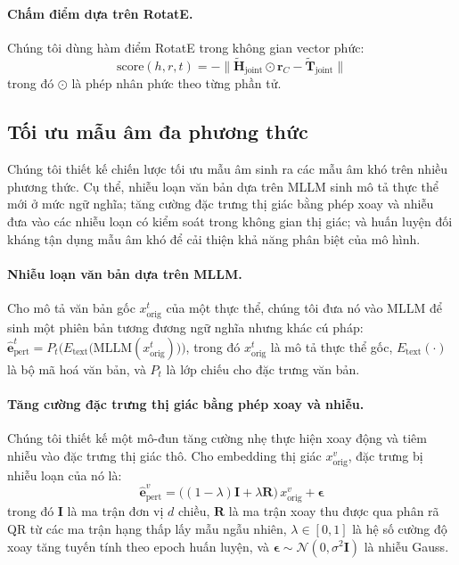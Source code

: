 \documentclass[10pt,twocolumn,a4paper]{article}
\newcommand{\score}{\mathrm{score}}
\begin{document}
\paragraph{Chấm điểm dựa trên RotatE.}
Chúng tôi dùng hàm điểm RotatE trong không gian vector phức:
\begin{equation}
\score(h, r, t) = -\big\|\tilde{\mathbf{H}}_{\mathrm{joint}} \odot \mathbf{r}_C - \tilde{\mathbf{T}}_{\mathrm{joint}}\big\|
\label{eq:10}
\end{equation}
trong đó $\odot$ là phép nhân phức theo từng phần tử.

\subsection{Tối ưu mẫu âm đa phương thức}

Chúng tôi thiết kế chiến lược tối ưu mẫu âm sinh ra các mẫu âm khó trên nhiều phương thức. Cụ thể, nhiễu loạn văn bản dựa trên MLLM sinh mô tả thực thể mới ở mức ngữ nghĩa; tăng cường đặc trưng thị giác bằng phép xoay và nhiễu đưa vào các nhiễu loạn có kiểm soát trong không gian thị giác; và huấn luyện đối kháng tận dụng mẫu âm khó để cải thiện khả năng phân biệt của mô hình.

\paragraph{Nhiễu loạn văn bản dựa trên MLLM.}
Cho mô tả văn bản gốc $x^t_{\mathrm{orig}}$ của một thực thể, chúng tôi đưa nó vào MLLM để sinh một phiên bản tương đương ngữ nghĩa nhưng khác cú pháp: $\hat{\mathbf{e}}^t_{\mathrm{pert}} = P_t\big(E_{\mathrm{text}}\big(\mathrm{MLLM}(x^t_{\mathrm{orig}})\big)\big)$, trong đó $x^t_{\mathrm{orig}}$ là mô tả thực thể gốc, $E_{\mathrm{text}}(\cdot)$ là bộ mã hoá văn bản, và $P_t$ là lớp chiếu cho đặc trưng văn bản.

\paragraph{Tăng cường đặc trưng thị giác bằng phép xoay và nhiễu.}
Chúng tôi thiết kế một mô-đun tăng cường nhẹ thực hiện xoay động và tiêm nhiễu vào đặc trưng thị giác thô. Cho embedding thị giác $x^v_{\mathrm{orig}}$, đặc trưng bị nhiễu loạn của nó là:
\begin{equation}
\hat{\mathbf{e}}^v_{\mathrm{pert}} = \big((1-\lambda)\mathbf{I} + \lambda\mathbf{R}\big)\, x^v_{\mathrm{orig}} + \boldsymbol{\epsilon}
\label{eq:11}
\end{equation}
trong đó $\mathbf{I}$ là ma trận đơn vị $d$ chiều, $\mathbf{R}$ là ma trận xoay thu được qua phân rã QR từ các ma trận hạng thấp lấy mẫu ngẫu nhiên, $\lambda \in [0,1]$ là hệ số cường độ xoay tăng tuyến tính theo epoch huấn luyện, và $\boldsymbol{\epsilon} \sim \mathcal{N}(0, \sigma^2\mathbf{I})$ là nhiễu Gauss.
\end{document}
